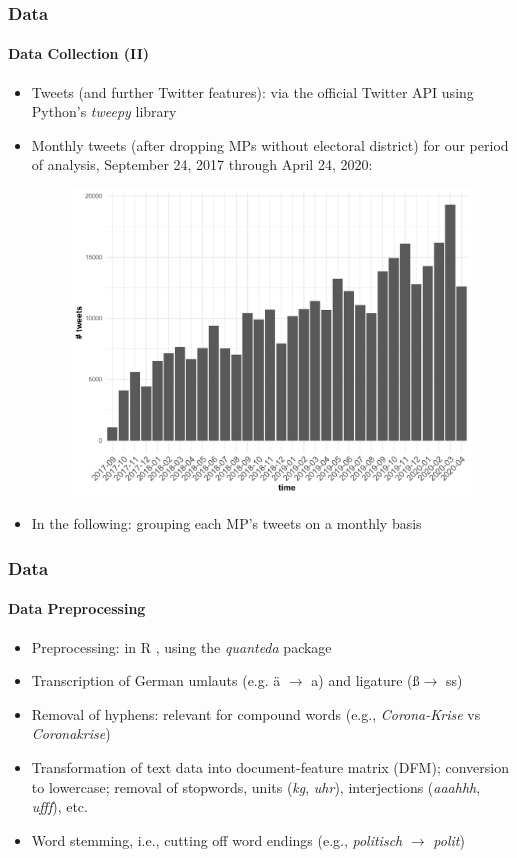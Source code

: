 \documentclass[xcolor=dvipsnames]{beamer}
\begin{document}
\begin{frame}
\frametitle{Data}
\framesubtitle{Data Collection (II)}
\begin{itemize}
\item Tweets (and further Twitter features): via the official Twitter API using Python's \textit{tweepy} library\cite{roesslein2020tweepy}
\item Monthly tweets (after dropping MPs without electoral district) for our period of analysis, September 24, 2017 through April 24, 2020:
	\begin{figure}[h!]
  	\centering
  	\includegraphics[scale = 0.30]{../plots/3/monthly_tweets.pdf}
	\end{figure}
\item In the following: grouping each MP's tweets on a monthly basis
\end{itemize}
\end{frame}

\begin{frame}
\frametitle{Data}
\framesubtitle{Data Preprocessing}
\begin{itemize}
\item Preprocessing: in R \cite{R}, using the \textit{quanteda} package \cite{quanteda}
\item Transcription of German umlauts (e.g. \"a $\rightarrow$ a) and ligature (\ss $\rightarrow$ ss)
\item Removal of hyphens: relevant for compound words (e.g., \textit{Corona-Krise} vs \textit{Coronakrise})
\item Transformation of text data into document-feature matrix (DFM); conversion to lowercase; removal of stopwords, units (\textit{kg}, \textit{uhr}), interjections (\textit{aaahhh}, \textit{ufff}), etc.
\item Word stemming, i.e., cutting off word endings (e.g., \textit{politisch} $\rightarrow$ \textit{polit}) \cite{lucas2015computer}
\end{itemize}
\end{frame}
\end{document}
